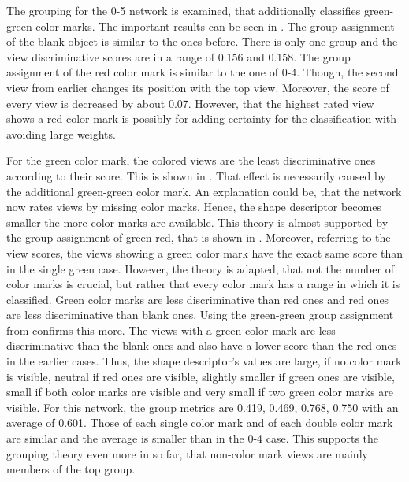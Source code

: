 The grouping for the 0-5 network is examined, that additionally classifies green-green color marks.
The important results can be seen in .
The group assignment of the blank object is similar to the ones before.
There is only one group and the view discriminative scores are in a range of 0.156 and 0.158.
The group assignment of the red color mark is similar to the one of 0-4.
Though, the second view from earlier changes its position with the top view.
Moreover, the score of every view is decreased by about 0.07.
However, that the highest rated view shows a red color mark is possibly for adding certainty for the classification with avoiding large weights.

For the green color mark, the colored views are the least discriminative ones according to their score.
This is shown in .
That effect is necessarily caused by the additional green-green color mark.
An explanation could be, that the network now rates views by missing color marks.
Hence, the shape descriptor becomes smaller the more color marks are available.
This theory is almost supported by the group assignment of green-red, that is shown in .
Moreover, referring to the view scores, the views showing a green color mark have the exact same score than in the single green case.
However, the theory is adapted, that not the number of color marks is crucial, but rather that every color mark has a range in which it is classified.
Green color marks are less discriminative than red ones and red ones are less discriminative than blank ones.
Using the green-green group assignment from  confirms this more.
The views with a green color mark are less discriminative than the blank ones and also have a lower score than the red ones in the earlier cases.
Thus, the shape descriptor's values are large, if no color mark is visible, neutral if red ones are visible, slightly smaller if green ones are visible, small if both color marks are visible and very small if two green color marks are visible.
For this network, the group metrics are 0.419, 0.469, 0.768, 0.750 with an average of 0.601.
Those of each single color mark and of each double color mark are similar and the average is smaller than in the 0-4 case.
This supports the grouping theory even more in so far, that non-color mark views are mainly members of the top group.
